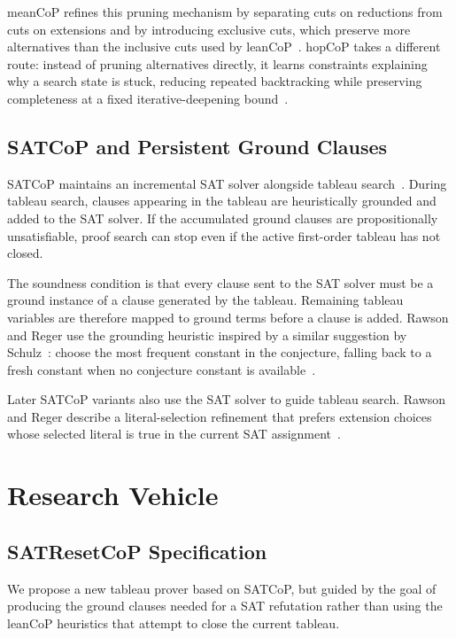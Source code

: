 \documentclass{EasyChair3.5/easychair}
\newcommand{\cop}[1]{\textsf{#1}}
\begin{document}
\cop{meanCoP} refines this pruning mechanism by separating cuts on reductions from cuts on extensions and by introducing exclusive cuts, which preserve more alternatives than the inclusive cuts used by \cop{leanCoP}~\cite{meancop}.
\cop{hopCoP} takes a different route: instead of pruning alternatives directly, it learns constraints explaining why a search state is stuck, reducing repeated backtracking while preserving completeness at a fixed iterative-deepening bound~\cite{rawsonConstraintLearningNonconfluent2026}.

\subsection{\cop{SATCoP} and Persistent Ground Clauses}
\label{satcop}

\cop{SATCoP} maintains an incremental SAT solver alongside tableau search~\cite{satcop}.
During tableau search, clauses appearing in the tableau are heuristically grounded and added to the SAT solver.
If the accumulated ground clauses are propositionally unsatisfiable, proof search can stop even if the active first-order tableau has not closed.

The soundness condition is that every clause sent to the SAT solver must be a ground instance of a clause generated by the tableau.
Remaining tableau variables are therefore mapped to ground terms before a clause is added.
Rawson and Reger use the grounding heuristic inspired by a similar suggestion by Schulz~\cite{schulzSATInterpretation}: choose the most frequent constant in the conjecture, falling back to a fresh constant when no conjecture constant is available~\cite{satcop}.

Later \cop{SATCoP} variants also use the SAT solver to guide tableau search.
Rawson and Reger describe a literal-selection refinement that prefers extension choices whose selected literal is true in the current SAT assignment~\cite[\S~9.1]{satcop}.

\section{Research Vehicle}

\subsection{\cop{SATResetCoP} Specification}
\label{satresetcop}

We propose a new tableau prover based on \cop{SATCoP}, but guided by the goal of producing the ground clauses needed for a SAT refutation rather than using the \cop{leanCoP} heuristics that attempt to close the current tableau.
\end{document}
